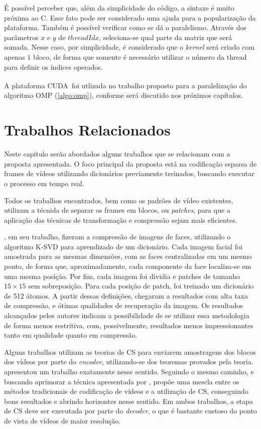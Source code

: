 \documentclass[cic,tc]{iiufrgs}
\newcommand{\reg}{\textsuperscript{\textregistered}}
\begin{document}
É possível perceber que, além da simplicidade do código, a sintaxe é muito próxima ao C. 
Esse fato pode ser considerado uma ajuda para a popularização da plataforma.
Também é possível verificar como se dá o paralelismo. 
Através dos parâmetros $x$ e $y$ de $threadIdx$, seleciona-se qual parte da matriz que 
será somada. 
Nesse caso, por simplicidade, é considerado que o \textit{kernel} será criado com apenas
$1$ bloco, de forma que somente é necessário utilizar o número da thread para definir 
os índices operados.

A plataforma CUDA\reg~foi utlizada no trabalho proposto para a paralelização do algoritmo
OMP (\ref{algo:omp}), conforme será discutido nos próximos capítulos.


\chapter{Trabalhos Relacionados}
Neste capítulo serão abordados alguns trabalhos que se relacionam com a proposta apresentada.
O foco principal da proposta está na codificação esparsa de frames de vídeos utilizando dicionários
previamente treinados, buscando executar o processo em tempo real.

Todos os trabalhos encontrados, bem como os padrões de vídeo existentes,
utilizam a técnida de separar os frames em blocos, ou \textit{patches},
para que a aplicação das técnicas de transformação e compressão sejam 
mais eficientes.

\citet{BRYTFACEKSVD}, em seu trabalho, fizeram a compressão de imagens de faces, 
utilizando o algoritmo K-SVD para aprendizado de um dicionário. 
Cada imagem facial foi amostrada para as mesmas dimensões, com as faces centralizadas
em um mesmo ponto, de forma que, aproximadamente, cada componente da face localiza-se
em uma mesma posição.
Por fim, cada imagem foi dividia e patches de tamanho $15\times 15$ sem sobreposição.
Para cada posição de patch, foi treinado um dicionário
de 512 átomos. A partir dessas definições, \citet{BRYTFACEKSVD} chegaram a resultados 
com alta taxa de compressão, e ótimas qualidades de recuperação da imagem.
Os resultados alcançados pelos autores indicam a possibilidade de se utilizar essa
metodologia de forma menos restritiva, com, possivelmente, resultados menos impressionantes
tanto em qualidade quanto em compressão.

Alguns trabalhos utilizam as teorias de CS para enviarem amostragens dos blocos
dos vídeos por parte do \textit{encoder}, utilizando-se dos teoremas provados pela teoria.
\citet{NebotDVC} apresentou um trabalho exatamente nesse sentido.
Seguindo o mesmo caminho, e buscando aprimorar a técnica apresentada por \citeauthor{NebotDVC}, 
\citet{DoDISCOS} propõe uma mescla entre os métodos tradicionais de codificação de vídeos
e a utilização de CS, conseguindo bons resultados e abrindo horizontes nesse sentido.
Em ambos trabalhos, a etapa de CS deve ser executada por parte do \textit{decoder}, 
o que é bastante custoso do ponto de vista de vídeos de maior resolução.
\end{document}
